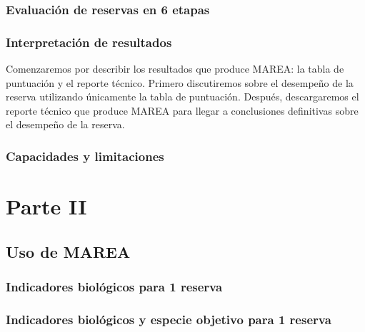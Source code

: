 \documentclass[]{krantz}
\begin{document}
\hypertarget{evaluacion-de-reservas-en-6-etapas}{%
\section{Evaluación de reservas en 6
etapas}\label{evaluacion-de-reservas-en-6-etapas}}

\hypertarget{interpretacion-de-resultados}{%
\section{Interpretación de
resultados}\label{interpretacion-de-resultados}}

Comenzaremos por describir los resultados que produce MAREA: la tabla de
puntuación y el reporte técnico. Primero discutiremos sobre el desempeño
de la reserva utilizando únicamente la tabla de puntuación. Después,
descargaremos el reporte técnico que produce MAREA para llegar a
conclusiones definitivas sobre el desempeño de la reserva.

\hypertarget{capacidades-y-limitaciones}{%
\section{Capacidades y limitaciones}\label{capacidades-y-limitaciones}}

\hypertarget{part-parte-ii}{%
\part{Parte II}\label{part-parte-ii}}

\hypertarget{uso-de-marea}{%
\chapter{Uso de MAREA}\label{uso-de-marea}}

\hypertarget{indicadores-biologicos-para-1-reserva}{%
\section{Indicadores biológicos para 1
reserva}\label{indicadores-biologicos-para-1-reserva}}

\hypertarget{indicadores-biologicos-y-especie-objetivo-para-1-reserva}{%
\section{Indicadores biológicos y especie objetivo para 1
reserva}\label{indicadores-biologicos-y-especie-objetivo-para-1-reserva}}
\end{document}

